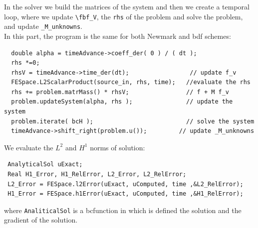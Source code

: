 \documentclass[english,a4paper]{article}
\newcommand{\fbf}{\text{\mbox{\boldmath $f$}}}
\begin{document}
In the solver we build the matrices of the  system and then we create a
temporal loop, where we update \verb"\fbf_V", the \verb"rhs" of the problem and
solve the problem, and update \verb"_M_unknowns".\\
In this part, the program is the same for both  Newmark and bdf schemes:
\begin{verbatim}
  double alpha = timeAdvance->coeff_der( 0 ) / ( dt );
  rhs *=0;
  rhsV = timeAdvance->time_der(dt);                 // update f_v
  FESpace.L2ScalarProduct(source_in, rhs, time);   //evaluate the rhs
  rhs += problem.matrMass() * rhsV;                // f + M f_v
  problem.updateSystem(alpha, rhs );               // update the system
  problem.iterate( bcH );                          // solve the system
  timeAdvance->shift_right(problem.u());         // update _M_unknowns
\end{verbatim}

We evaluate the $L^2$ and $H^1$ norms
of solution:
\begin{verbatim}
 AnalyticalSol uExact;
 Real H1_Error, H1_RelError, L2_Error, L2_RelError;
 L2_Error = FESpace.l2Error(uExact, uComputed, time ,&L2_RelError);
 H1_Error = FESpace.h1Error(uExact, uComputed, time ,&H1_RelError);
\end{verbatim}
where \verb"AnaliticalSol" is a
bcfunction in which is defined the
solution and the gradient of  the solution.\\
\end{document}
